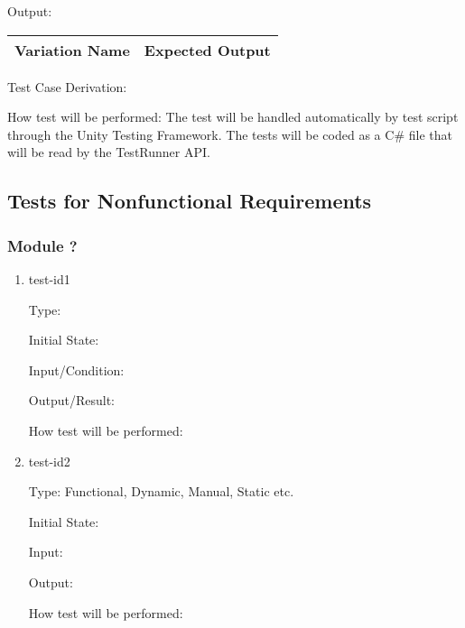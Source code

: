 \documentclass[12pt, titlepage]{article}
\begin{document}
\begin{enumerate}
\begin{tabular}{|c|c|}
		\hline
	\end{tabular}
	
	Output:
	\begin{tabular}{|c|c|}
		\hline
		\textbf{Variation Name} & \textbf{Expected Output}\\
		\hline
		
		\hline
	\end{tabular}
	
	Test Case Derivation: 
	
	How test will be performed: The test will be handled automatically by test 
	script through the Unity Testing Framework. The tests will be coded as a 
	C$\#$ file that will be read by the TestRunner API.  
	
\end{enumerate}

\subsection{Tests for Nonfunctional Requirements}



\subsubsection{Module ?}
		
\begin{enumerate}

\item{test-id1\\}

Type: 
					
Initial State: 
					
Input/Condition: 
					
Output/Result: 
					
How test will be performed: 
					
\item{test-id2\\}

Type: Functional, Dynamic, Manual, Static etc.
					
Initial State: 
					
Input: 
					
Output: 
					
How test will be performed: 

\end{enumerate}
\end{document}
